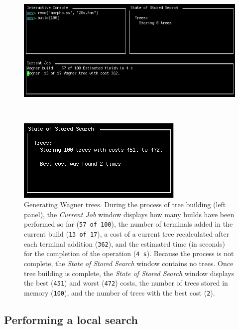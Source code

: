 {\begin{figure}
\centering
\begin{minipage}[c]{0.507\textwidth}
   		\includegraphics[width=\textwidth]{doc/figures/building1.jpg}
\end{minipage}
\,
\begin{minipage}[c]{0.453\textwidth}
	   	\includegraphics[width=\textwidth]{doc/figures/building2.jpg}
   	\end{minipage}
\caption{Generating Wagner trees. During the process of tree building (left panel), the \emph{Current Job} window 
displays how many builds have been performed so far (\texttt{57 of 100}), the number of terminals added in the current 
build (\texttt{13 of 17}), a cost of a current tree recalculated after each terminal addition (\texttt{362}), and the estimated
 time (in seconds) for the completion of the operation (\texttt{4 s}). Because the process is not complete, the 
 \emph{State of Stored Search} window contains no trees. Once tree building is complete, the \emph{State of Stored Search} 
 window displays the best (\texttt{451}) and worst (\texttt{472}) costs, the number of trees stored in memory (\texttt{100}), 
 and the number of trees with the best cost (\texttt{2}).} 
\label{fig:building}
\end{figure}

\subsection{Performing a local search}

}
